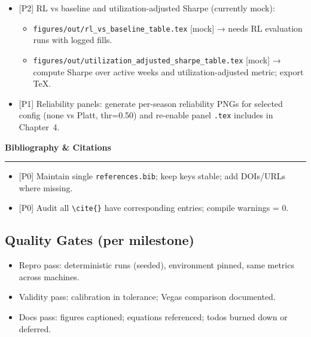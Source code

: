 \documentclass[11pt]{article}
\newcommand{\milestone}[1]{\vspace{0.5em}\noindent\textbf{\large #1}\par\vspace{0.25em}\hrule\vspace{0.5em}}
\newcommand{\prio}[1]{\textcolor{blue!70!black}{[#1]}}
\begin{document}
\begin{itemize}
  \item \prio{P2} RL vs baseline and utilization-adjusted Sharpe (currently mock):
    \begin{itemize}
      \item \texttt{figures/out/rl\_vs\_baseline\_table.tex} [mock] → needs RL evaluation runs with logged fills.
      \item \texttt{figures/out/utilization\_adjusted\_sharpe\_table.tex} [mock] → compute Sharpe over active weeks and utilization-adjusted metric; export TeX.
    \end{itemize}
  \item \prio{P1} Reliability panels: generate per-season reliability PNGs for selected config (none vs Platt, thr=0.50) and re-enable panel \texttt{.tex} includes in Chapter~4.
\end{itemize}

\milestone{Bibliography \& Citations}
\begin{itemize}
  \item \prio{P0} Maintain single \texttt{references.bib}; keep keys stable; add DOIs/URLs where missing.
  \item \prio{P0} Audit all \texttt{\textbackslash cite\{\}} have corresponding entries; compile warnings = 0.
\end{itemize}

\subsection*{Quality Gates (per milestone)}
\begin{itemize}
  \item Repro pass: deterministic runs (seeded), environment pinned, same metrics across machines.
  \item Validity pass: calibration in tolerance; Vegas comparison documented.
  \item Docs pass: figures captioned; equations referenced; todos burned down or deferred.
\end{itemize}
\end{document}

